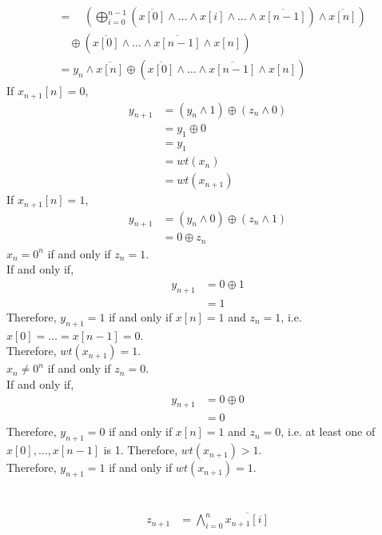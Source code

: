 \documentclass[fleqn, a4paper, 11pt, oneside]{amsart}
\theoremstyle{definition}
\theoremstyle{theorem}
\theoremstyle{remark}
\newcommand{\AND}{\wedge}
\newcommand{\bigAND}{\bigwedge}
\newcommand{\XOR}{\oplus}
\newcommand{\bigXOR}{\bigoplus}
\begin{document}
\begin{solution}
\begin{enumerate}[leftmargin = *]
\begin{align*}
				&= \quad \left( \bigXOR_{i = 0}^{n - 1} \left( \overline{x[0]} \AND \dots \AND x[i] \AND \dots \AND \overline{x[n - 1]} \right) \AND \overline{x[n]} \right)\\
				&\quad \XOR \left( \overline{x[0]} \AND \dots \AND  \overline{x[n - 1]} \AND x[n] \right)\\
				&= y_n \AND \overline{x[n]} \XOR \left( \overline{x[0]} \AND \dots \AND  \overline{x[n - 1]} \AND x[n] \right)
			\end{align*}
			If $x_{n + 1}[n] = 0$,
			\begin{align*}
				y_{n + 1} &= \left( y_n \AND 1 \right) \XOR \left( z_n \AND 0 \right)\\
				&= y_1 \XOR 0\\
				&= y_1\\
				&= wt(x_n)\\
				&= wt(x_{n + 1})
			\end{align*}
			If $x_{n + 1}[n] = 1$,
			\begin{align*}
				y_{n + 1} &= \left( y_n \AND 0 \right) \XOR \left( z_n \AND 1 \right)\\
				&= 0 \XOR z_n
			\end{align*}
			$x_n = 0^n$ if and only if  $z_n = 1$.\\
			If and only if,
			\begin{align*}
				y_{n + 1} &= 0 \XOR 1\\
				&= 1
			\end{align*}
			Therefore, $y_{n + 1} = 1$ if and only if $x[n] = 1$ and $z_n = 1$, i.e. $x[0] = \dots = x[n - 1] = 0$.\\
			Therefore, $wt(x_{n + 1}) = 1$.\\
			$x_n \neq 0^n$ if and only if $z_n = 0$.\\
			If and only if,
			\begin{align*}
				y_{n + 1} &= 0 \XOR 0\\
				&= 0
			\end{align*}
			Therefore, $y_{n + 1} = 0$ if and only if $x[n] = 1$ and $z_n = 0$, i.e. at least one of $x[0], \dots, x[n - 1]$ is 1.
			Therefore, $wt(x_{n + 1}) > 1$.
			~\\
			Therefore, $y_{n + 1} = 1$ if and only if $wt(x_{n + 1}) = 1$.\\
			~\\
			~\\
			\begin{align*}
				z_{n + 1} &= \bigAND_{i = 0}^{n} \overline{x_{n + 1}[i]}\\

\end{align*}
\end{enumerate}
\end{solution}
\end{document}
